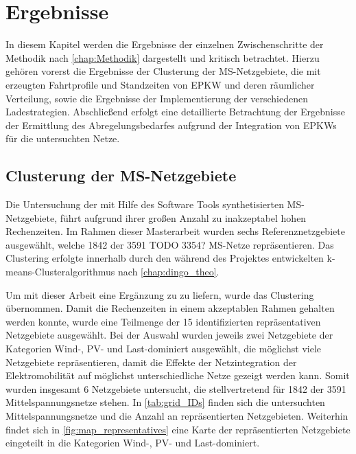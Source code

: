 \section{Ergebnisse}

In diesem Kapitel werden die Ergebnisse der einzelnen Zwischenschritte der Methodik nach \autoref{chap:Methodik} dargestellt und kritisch betrachtet.
Hierzu gehören vorerst die Ergebnisse der Clusterung der \gls{MS}-Netzgebiete, die mit \simbev erzeugten Fahrtprofile und Standzeiten von \gls{EPKW} und deren räumlicher Verteilung, sowie die Ergebnisse der Implementierung der verschiedenen Ladestrategien.
Abschließend erfolgt eine detaillierte Betrachtung der Ergebnisse der Ermittlung des Abregelungsbedarfes aufgrund der Integration von \glspl{EPKW} für die untersuchten Netze.


\subsection{Clusterung der MS-Netzgebiete}


Die Untersuchung der mit Hilfe des Software Tools \dingo synthetisierten \gls{MS}-Netzgebiete, führt aufgrund ihrer großen Anzahl zu inakzeptabel hohen Rechenzeiten.
Im Rahmen dieser Masterarbeit wurden sechs Referenznetzgebiete ausgewählt, welche \num{1842} der \num{3591} {\color{red} TODO 3354?} \gls{MS}-Netze repräsentieren.
Das Clustering erfolgte innerhalb \cite{Schachler} durch den während des \openego Projektes entwickelten k-means-Clusteralgorithmus nach \autoref{chap:dingo_theo}. \medskip

Um mit dieser Arbeit eine Ergänzung zu \cite{Schachler} zu liefern, wurde das Clustering übernommen.
Damit die Rechenzeiten in einem akzeptablen Rahmen gehalten werden konnte, wurde eine Teilmenge der \num{15} identifizierten repräsentativen Netzgebiete ausgewählt.
Bei der Auswahl wurden jeweils zwei Netzgebiete der Kategorien Wind-, \gls{PV}- und Last-dominiert ausgewählt, die möglichst viele Netzgebiete repräsentieren, damit die Effekte der Netzintegration der Elektromobilität auf möglichst unterschiedliche Netze gezeigt werden kann.
Somit wurden insgesamt \num{6} Netzgebiete untersucht, die stellvertretend für \num{1842} der \num{3591} Mittelspannungsnetze stehen.
In \autoref{tab:grid_IDs} finden sich die untersuchten Mittelspannungsnetze und die Anzahl an repräsentierten Netzgebieten.
Weiterhin findet sich in \autoref{fig:map_representatives} eine Karte der repräsentierten Netzgebiete eingeteilt in die Kategorien Wind-, \gls{PV}- und Last-dominiert.

